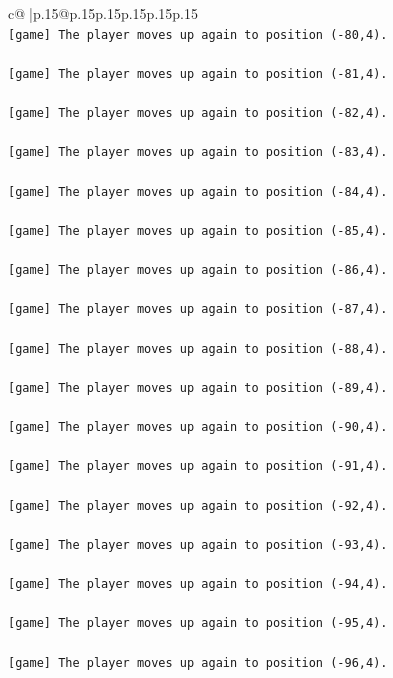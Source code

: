 \documentclass{article}
\begin{document}
{\begin{supertabular}{c@{$\;$}|p{.15\linewidth}@{}p{.15\linewidth}p{.15\linewidth}p{.15\linewidth}p{.15\linewidth}p{.15\linewidth}}
{{{\\ 
\texttt{{[}game{]} The player moves up again to position ({-}80,4).} \\
\\ 
\texttt{{[}game{]} The player moves up again to position ({-}81,4).} \\
\\ 
\texttt{{[}game{]} The player moves up again to position ({-}82,4).} \\
\\ 
\texttt{{[}game{]} The player moves up again to position ({-}83,4).} \\
\\ 
\texttt{{[}game{]} The player moves up again to position ({-}84,4).} \\
\\ 
\texttt{{[}game{]} The player moves up again to position ({-}85,4).} \\
\\ 
\texttt{{[}game{]} The player moves up again to position ({-}86,4).} \\
\\ 
\texttt{{[}game{]} The player moves up again to position ({-}87,4).} \\
\\ 
\texttt{{[}game{]} The player moves up again to position ({-}88,4).} \\
\\ 
\texttt{{[}game{]} The player moves up again to position ({-}89,4).} \\
\\ 
\texttt{{[}game{]} The player moves up again to position ({-}90,4).} \\
\\ 
\texttt{{[}game{]} The player moves up again to position ({-}91,4).} \\
\\ 
\texttt{{[}game{]} The player moves up again to position ({-}92,4).} \\
\\ 
\texttt{{[}game{]} The player moves up again to position ({-}93,4).} \\
\\ 
\texttt{{[}game{]} The player moves up again to position ({-}94,4).} \\
\\ 
\texttt{{[}game{]} The player moves up again to position ({-}95,4).} \\
\\ 
\texttt{{[}game{]} The player moves up again to position ({-}96,4).} \\
}}}
\end{supertabular}}
\end{document}
